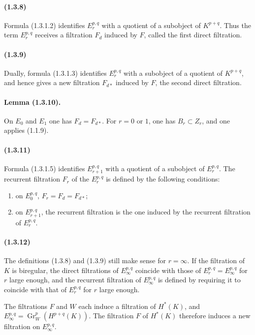 \documentclass[10pt]{article}
\newcommand{\Gr}{\operatorname{Gr}}
\begin{document}
\paragraph{(1.3.8)} Formula (1.3.1.2) identifies $E_r^{p,q}$ with a quotient of a subobject of $K^{p+q}$. Thus the term $E_r^{p,q}$ receives a filtration $F_d$ induced by $F$, called the first direct filtration.

\paragraph{(1.3.9)} Dually, formula (1.3.1.3) identifies $E_r^{p,q}$ with a subobject of a quotient of $K^{p+q}$, and hence gives a new filtration $F_{d*}$ induced by $F$, the second direct filtration.

\paragraph{Lemma (1.3.10).} On $E_0$ and $E_1$ one has $F_d=F_{d*}$. For $r=0$ or $1$, one has $B_r\subset Z_r$, and one applies (1.1.9).

\paragraph{(1.3.11)} Formula (1.3.1.5) identifies $E_{r+1}^{p,q}$ with a quotient of a subobject of $E_r^{p,q}$. The recurrent filtration $F_r$ of the $E_r^{p,q}$ is defined by the following conditions:
\begin{enumerate}[label=(\roman*)]
\item on $E_0^{p,q}$, $F_r=F_d=F_{d*}$;
\item on $E_{r+1}^{p,q}$, the recurrent filtration is the one induced by the recurrent filtration of $E_r^{p,q}$.
\end{enumerate}

\paragraph{(1.3.12)} The definitions (1.3.8) and (1.3.9) still make sense for $r=\infty$. If the filtration of $K$ is biregular, the direct filtrations of $E_\infty^{p,q}$ coincide with those of $E_r^{p,q}=E_\infty^{p,q}$ for $r$ large enough, and the recurrent filtration of $E_\infty^{p,q}$ is defined by requiring it to coincide with that of $E_r^{p,q}$ for $r$ large enough.

The filtrations $F$ and $W$ each induce a filtration of $H^*(K)$, and $E_\infty^{p,q}=\Gr_W^p(H^{p+q}(K))$. The filtration $F$ of $H^*(K)$ therefore induces a new filtration on $E_\infty^{p,q}$.
\end{document}
